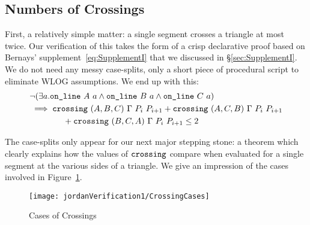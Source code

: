 \subsection{Numbers of Crossings}
First, a relatively simple matter: a single segment crosses a triangle at most twice. Our verification of this takes the form of a crisp declarative proof based on Bernays' supplement~\eqref{eq:SupplementI} that we discussed in \S\ref{sec:SupplementI}. We do not need any messy case-splits, only a short piece of procedural script to eliminate WLOG assumptions. We end up with this:
\begin{equation}
  \begin{split}
    &\neg(\exists a.\texttt{on\_line}\ A\ a\wedge \texttt{on\_line}\ B\ a\wedge \texttt{on\_line}\ C\ a)\\
    &\implies \texttt{crossing}\ (A,B,C)\ \Gamma\ P_i\ P_{i+1} + \texttt{crossing}\ (A,C,B)\ \Gamma\ P_i\ P_{i+1}\\
    &\qquad\qquad+ \texttt{crossing}\ (B,C,A)\ \Gamma\ P_i\ P_{i+1} \leq 2
  \end{split}
\end{equation}

The case-splits only appear for our next major stepping stone: a theorem which clearly explains how the values of $\texttt{crossing}$ compare when evaluated for a single segment at the various sides of a triangle. We give an impression of the cases involved in Figure~\ref{fig:CrossingCases}.

\begin{figure}
\centering\texttt{[image: jordanVerification1/CrossingCases]}
\caption{Cases of Crossings}
\label{fig:CrossingCases}
\end{figure}

